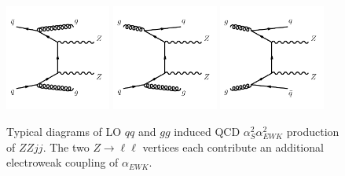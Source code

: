 \begin{figure}[!htbp]
  \begin{center}
  \includegraphics[width=0.31\textwidth]{figures/Theory/diagramQCDZZjjqq.pdf}
  \includegraphics[width=0.31\textwidth]{figures/Theory/diagramQCDZZjjqg.pdf}
  \includegraphics[width=0.31\textwidth]{figures/Theory/diagramQCDZZjjgg.pdf}
   \end{center}
  \caption{Typical diagrams of LO $qq$ and $gg$ induced QCD $\alpha_{S}^2 \alpha_{EWK}^{2}$ production of $ZZjj$. The two $Z\rightarrow \ell \ell$ vertices each contribute an additional electroweak coupling of $\alpha_{EWK}$. \label{fig:ZZjjFeynmanDiag_QCD_qq}}
 \end{figure} 
 
